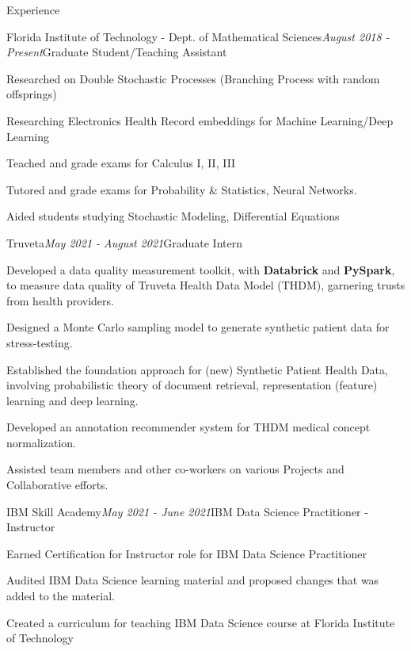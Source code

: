 
\begin{rSection}{Experience}

    \begin{rSubsection}{Florida Institute of Technology - Dept. of Mathematical Sciences}{\em August 2018 - Present}{Graduate Student/Teaching Assistant}{}
        \item Researched on Double Stochastic Processes (Branching Process with random offsprings)
        \item Researching Electronics Health Record embeddings for Machine Learning/Deep Learning
        \item Teached and grade exams for Calculus I, II, III
        \item Tutored and grade exams for Probability \& Statistics, Neural Networks.
        \item Aided students studying Stochastic Modeling, Differential Equations
    \end{rSubsection}

    \begin{rSubsection}{Truveta}{\em May 2021 - August 2021}{Graduate Intern}{}
        \item Developed a data quality measurement toolkit, with \textbf{Databrick} and \textbf{PySpark}, to measure data quality of Truveta Health Data Model (THDM), garnering trusts from health providers.
        \item Designed a Monte Carlo sampling model to generate synthetic patient data for stress-testing.
        \item Established the foundation approach for (new) Synthetic Patient Health Data, involving probabilistic theory of document retrieval, representation (feature) learning and deep learning.
        \item Developed an annotation recommender system for THDM medical concept normalization.
        \item Assisted team members and other co-workers on various Projects and Collaborative efforts.
    \end{rSubsection}

    \begin{rSubsection}{IBM Skill Academy}{\em May 2021 - June 2021}{IBM Data Science Practitioner - Instructor}{}
        \item Earned Certification for Instructor role for IBM Data Science Practitioner
        \item Audited IBM Data Science learning material and proposed changes that was added to the material.
        \item Created a curriculum for teaching IBM Data Science course at Florida Institute of Technology
    \end{rSubsection}


\end{rSection}